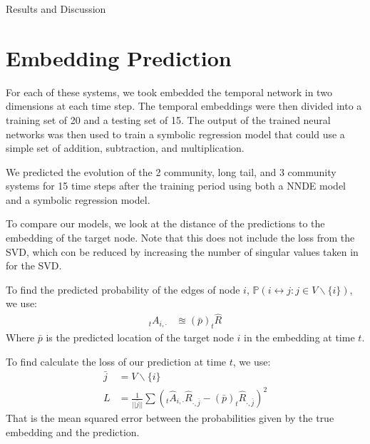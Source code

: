 \documentclass[12pt]{amsbook}
\begin{document}
\begin{chapter}{Results and Discussion}
    \section{Embedding Prediction}
        For each of these systems, we took embedded the temporal network in two dimensions at each time step. The temporal embeddings were then divided into a training set of 20 and a testing set of 15. The output of the trained neural networks was then used to train a symbolic regression model that could use a simple set of addition, subtraction, and multiplication. 

        We predicted the evolution of the 2 community, long tail, and 3 community systems for 15 time steps after the training period using both a NNDE model and a symbolic regression model.

        To compare our models, we look at the distance of the predictions to the embedding of the target node. Note that this does not include the loss from the SVD, which con be reduced by increasing the number of singular values taken in for the SVD.
        
        To find the predicted probability of the edges of node $i$, $\mathbb{P}(i \leftrightarrow j:j\in V\smallsetminus \{i\})$, we use: 
        \begin{align}
            _tA_{i,\cdot} &\approxeq (\bar p) _t\hat R
        \end{align}
        Where $\bar p$ is the predicted location of the target node $i$ in the embedding at time $t$.

        To find calculate the loss of our prediction at time $t$, we use:
        \begin{align}
            \bar j &= V \smallsetminus \{i\}  \\
            L &= \frac{1}{||\bar j||}\sum{(_t\hat A_{i,\cdot} \hat R_{\cdot,\bar j} - (\bar p) _t\hat R_{\cdot,\bar j})^2}
        \end{align}
        That is the mean squared error between the probabilities given by the true embedding and the prediction.
        

\end{chapter}
\end{document}
